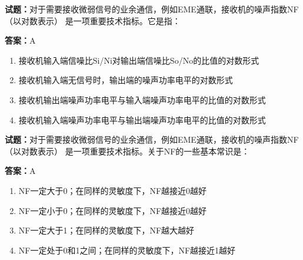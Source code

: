 \documentclass{ctexbook}
\begin{document}




\vspace{1em}

\textbf{试题：}对于需要接收微弱信号的业余通信，例如EME通联，接收机的噪声指数NF（以对数表示）
是一项重要技术指标。它是指： 

\textbf{答案：}A 

\begin{enumerate}[leftmargin=3em]
  \item 接收机输入端信噪比Si/Ni对输出端信噪比So/No的比值的对数形式 

  \item 接收机输入端无信号时，输出端的噪声功率电平的对数形式 

  \item 接收机输出端噪声功率电平与输入端噪声功率电平的比值的对数形式 

  \item 接收机输入端噪声功率电平与输出端噪声功率电平的比值的对数形式 

\end{enumerate}





\vspace{1em}

\textbf{试题：}对于需要接收微弱信号的业余通信，例如EME通联，接收机的噪声指数NF（以对数表示）
是一项重要技术指标。关于NF的一些基本常识是： 

\textbf{答案：}A 

\begin{enumerate}[leftmargin=3em]
  \item NF一定大于0；在同样的灵敏度下，NF越接近0越好 

  \item NF一定小于0；在同样的灵敏度下，NF越接近0越好 

  \item NF一定大于1；在同样的灵敏度下，NF越大越好 

  \item NF一定处于0和1之间；在同样的灵敏度下，NF越接近1越好 

\end{enumerate}



\end{document}
